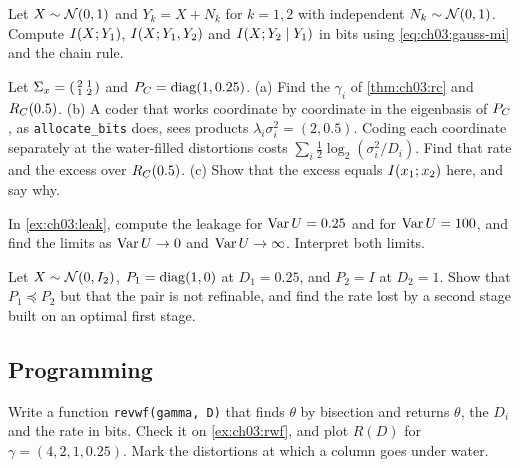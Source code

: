 \begin{exercise}\label{exr:ch03:twolooks}
Let $X\sim\mathcal{N}(0,1)$ and $Y_k=X+N_k$ for $k=1,2$ with independent $N_k\sim\mathcal{N}(0,1)$. Compute $I(X;Y_1)$, $I(X;Y_1,Y_2)$ and $I(X;Y_2\mid Y_1)$ in bits using \eqref{eq:ch03:gauss-mi} and the chain rule.
\end{exercise}

\begin{exercise}\label{exr:ch03:noncommute}
Let $\Sigma_x=\begin{psmallmatrix}2&1\\1&2\end{psmallmatrix}$ and $P_C=\operatorname{diag}(1,0.25)$. (a) Find the $\gamma_i$ of \cref{thm:ch03:rc} and $R_C(0.5)$. (b) A coder that works coordinate by coordinate in the eigenbasis of $P_C$, as \texttt{allocate\_bits} does, sees products $\lambda_i\sigma_i^2=(2,0.5)$. Coding each coordinate separately at the water-filled distortions costs $\sum_i\frac12\log_2(\sigma_i^2/D_i)$. Find that rate and the excess over $R_C(0.5)$. (c) Show that the excess equals $I(x_1;x_2)$ here, and say why.
\end{exercise}

\begin{exercise}\label{exr:ch03:leak-limits}
In \cref{ex:ch03:leak}, compute the leakage for $\operatorname{Var} U=0.25$ and for $\operatorname{Var} U=100$, and find the limits as $\operatorname{Var} U\to0$ and $\operatorname{Var} U\to\infty$. Interpret both limits.
\end{exercise}

\begin{exercise}\label{exr:ch03:refine}
Let $X\sim\mathcal{N}(0,I_2)$, $P_1=\operatorname{diag}(1,0)$ at $D_1=0.25$, and $P_2=I$ at $D_2=1$. Show that $P_1\preceq P_2$ but that the pair is not refinable, and find the rate lost by a second stage built on an optimal first stage.
\end{exercise}

\subsection*{Programming}

\begin{exercise}\label{exr:ch03:prog-wf}
Write a function \texttt{revwf(gamma, D)} that finds $\theta$ by bisection and returns $\theta$, the $D_i$ and the rate in bits. Check it on \cref{ex:ch03:rwf}, and plot $R(D)$ for $\gamma=(4,2,1,0.25)$. Mark the distortions at which a column goes under water.
\end{exercise}

